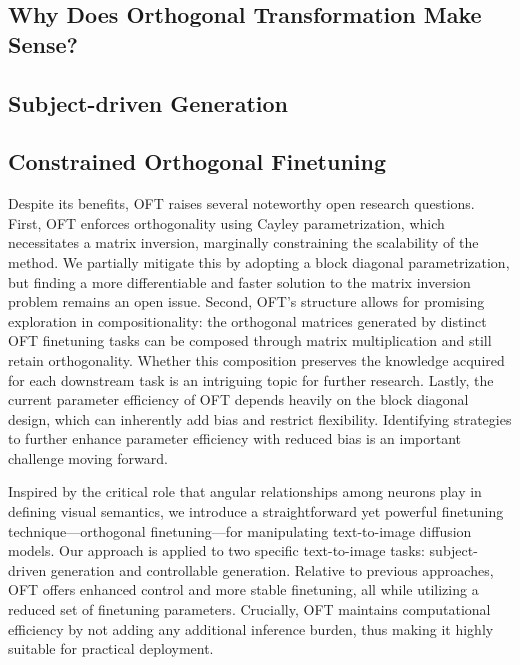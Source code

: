 \begin{itemize}[leftmargin=*,nosep]
\begin{itemize}[leftmargin=*,nosep]

\subsection{Why Does Orthogonal Transformation Make Sense?}

\subsection{Subject-driven Generation}

\subsection{Constrained Orthogonal Finetuning}

Despite its benefits, OFT raises several noteworthy open research questions. First, OFT enforces orthogonality using Cayley parametrization, which necessitates a matrix inversion, marginally constraining the scalability of the method. We partially mitigate this by adopting a block diagonal parametrization, but finding a more differentiable and faster solution to the matrix inversion problem remains an open issue. Second, OFT's structure allows for promising exploration in compositionality: the orthogonal matrices generated by distinct OFT finetuning tasks can be composed through matrix multiplication and still retain orthogonality. Whether this composition preserves the knowledge acquired for each downstream task is an intriguing topic for further research. Lastly, the current parameter efficiency of OFT depends heavily on the block diagonal design, which can inherently add bias and restrict flexibility. Identifying strategies to further enhance parameter efficiency with reduced bias is an important challenge moving forward.

Inspired by the critical role that angular relationships among neurons play in defining visual semantics, we introduce a straightforward yet powerful finetuning technique—orthogonal finetuning—for manipulating text-to-image diffusion models. Our approach is applied to two specific text-to-image tasks: subject-driven generation and controllable generation. Relative to previous approaches, OFT offers enhanced control and more stable finetuning, all while utilizing a reduced set of finetuning parameters. Crucially, OFT maintains computational efficiency by not adding any additional inference burden, thus making it highly suitable for practical deployment.


\end{itemize}
\end{itemize}
